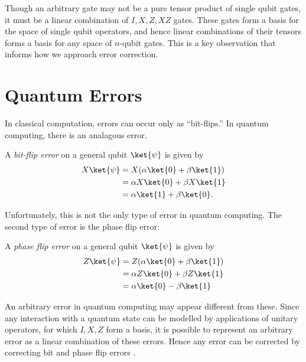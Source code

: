 \documentclass{article}
\begin{document}
        Though an arbitrary gate may not be a pure tensor product of single qubit gates, it must be a linear combination of $I, X, Z, XZ$ gates.
        These gates form a basis for the space of single qubit operators, and hence linear combinations of their tensors forms a basis for any space of $n$-qubit gates.
        This is a key observation that informs how we approach error correction.

\section{Quantum Errors}

        In classical computation, errors can occur only as ``bit-flips.''
        In quantum computing, there is an analagous error.
        \begin{definition}
                A \textit{bit-flip error} on a general qubit $\ket{\psi}$ is given by
                \begin{align*}
                X \ket{\psi} &= X(\alpha \ket{0} + \beta \ket{1})\\
                &= \alpha X \ket{0} + \beta X \ket{1}\\
                &= \alpha \ket{1} + \beta \ket{0}.
                \end{align*}
        \end{definition}

        Unfortunately, this is not the only type of error in quantum computing.
        The second type of error is the phase flip error:
        \begin{definition}
                A \textit{phase flip error} on a general qubit $\ket{\psi}$ is given by
                \begin{align*}
                Z \ket{\psi} &= Z(\alpha \ket{0} + \beta \ket{1})\\
                &= \alpha Z \ket{0} + \beta Z \ket{1}\\
                &= \alpha \ket{0} - \beta \ket{1}
                \end{align*}
        \end{definition}

        An arbitrary error in quantum computing may appear different from these.
        Since any interaction with a quantum state can be modelled by applications of unitary operators, for which $I, X, Z$ form a basis, it is possible to represent an arbitrary error as a linear combination of these errors.
        Hence any error can be corrected by correcting bit and phase flip errors \cite{Nielsen}.
\end{document}
